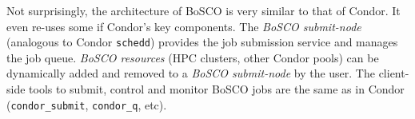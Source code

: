\documentclass{sig-alternate}
\begin{document}
Not surprisingly, the architecture of BoSCO is very similar to that of Condor.
It even re-uses some if Condor's key components. The  \textit{BoSCO submit-node}
(analogous to Condor \texttt{schedd}) provides the job  submission service and
manages the job queue. \textit{BoSCO resources} (HPC clusters, other Condor
pools) can be dynamically added and removed to a \textit{BoSCO submit-node}
by the user. The client-side tools to submit, control and monitor BoSCO jobs
are the same as in Condor (\texttt{condor\_submit}, \texttt{condor\_q}, etc).




\end{document}
